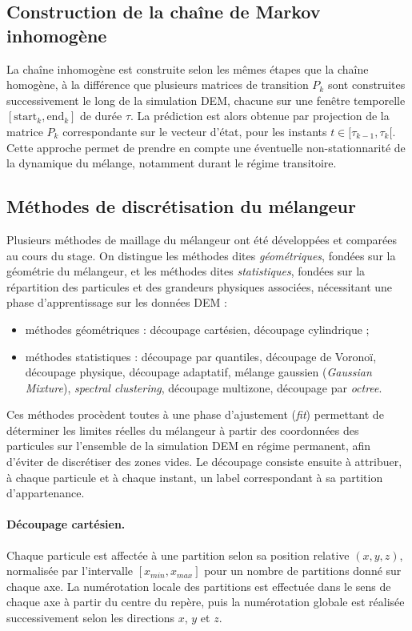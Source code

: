 \documentclass{MemoireMaster}
\begin{document}
\subsection{Construction de la chaîne de Markov inhomogène}
La chaîne inhomogène est construite selon les mêmes étapes que la chaîne homogène, à la différence que plusieurs matrices de transition $P_k$ sont construites successivement le long de la simulation DEM, chacune sur une fenêtre temporelle $[\mathrm{start}_k, \mathrm{end}_k]$ de durée $\tau$. La prédiction est alors obtenue par projection de la matrice $P_k$ correspondante sur le vecteur d'état, pour les instants $t \in [\tau_{k-1}, \tau_k[$. Cette approche permet de prendre en compte une éventuelle non-stationnarité de la dynamique du mélange, notamment durant le régime transitoire.

\subsection{Méthodes de discrétisation du mélangeur}
\label{sec:discretisation}
Plusieurs méthodes de maillage du mélangeur ont été développées et comparées au cours du stage. On distingue les méthodes dites \emph{géométriques}, fondées sur la géométrie du mélangeur, et les méthodes dites \emph{statistiques}, fondées sur la répartition des particules et des grandeurs physiques associées, nécessitant une phase d'apprentissage sur les données DEM :
\begin{itemize}
\item méthodes géométriques : découpage cartésien, découpage cylindrique ;
\item méthodes statistiques : découpage par quantiles, découpage de Voronoï, découpage physique, découpage adaptatif, mélange gaussien (\emph{Gaussian Mixture}), \emph{spectral clustering}, découpage multizone, découpage par \emph{octree}.
\end{itemize}
Ces méthodes procèdent toutes à une phase d'ajustement (\emph{fit}) permettant de déterminer les limites réelles du mélangeur à partir des coordonnées des particules sur l'ensemble de la simulation DEM en régime permanent, afin d'éviter de discrétiser des zones vides. Le découpage consiste ensuite à attribuer, à chaque particule et à chaque instant, un label correspondant à sa partition d'appartenance.

\paragraph{Découpage cartésien.} Chaque particule est affectée à une partition selon sa position relative $(x,y,z)$, normalisée par l'intervalle $[x_{min}, x_{max}]$ pour un nombre de partitions donné sur chaque axe. La numérotation locale des partitions est effectuée dans le sens de chaque axe à partir du centre du repère, puis la numérotation globale est réalisée successivement selon les directions $x$, $y$ et $z$.
\end{document}
